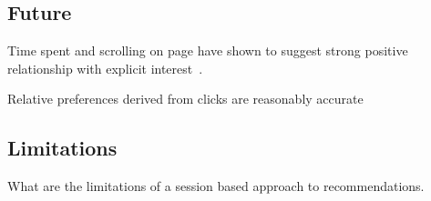 \subsection{Future}
    Time spent and scrolling on page have shown to suggest strong positive relationship with explicit interest~\cite{Claypool01inferringuser}.

    Relative preferences derived from clicks are reasonably accurate~\cite{Joachims:2007:EAI:1229179.1229181}

\subsection{Limitations}
    What are the limitations of a session based approach to recommendations.
